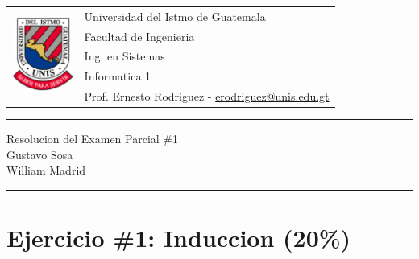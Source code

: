 \documentclass{article}
\newcommand{\horrule}[1]{\rule{\linewidth}{#1}}
\begin{document}
\begin{tabular}{l l}
\multirow{5}{*}{\includegraphics[width=2cm]{logo.png}}
 & Universidad del Istmo de Guatemala \\
 & Facultad de Ingenieria \\
 & Ing. en Sistemas \\
 & Informatica 1 \\
 & Prof. Ernesto Rodriguez - \href{mailto:erodriguez@unis.edu.gt}{erodriguez@unis.edu.gt} \\
\end{tabular}


\begin{center}
        \horrule{0.5pt}
        \huge{Resolucion del Examen Parcial \#1} \\
        \large{Gustavo Sosa\\ William Madrid} \\
        \horrule{1pt}
\end{center}

\section*{Ejercicio \#1: Induccion (20\%)}
\end{document}
